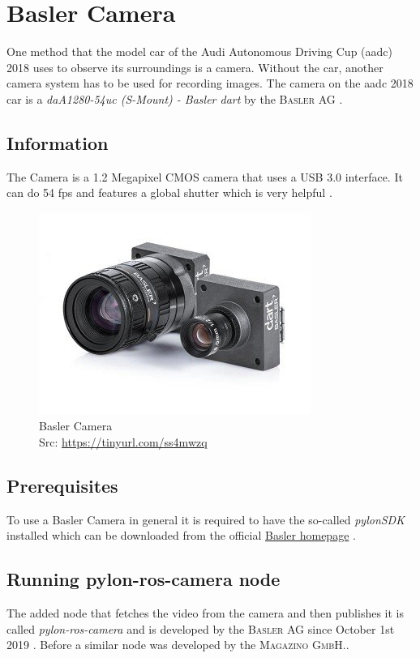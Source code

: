 
\chapter{Basler Camera\authorA}\label{ref:baslercamera}
One method that the model car of the Audi Autonomous Driving Cup (\gls{aadc}) 2018 uses to observe its surroundings is a camera. Without the car, another camera system has to be used for recording images. The camera on the \gls{aadc} 2018 car is a \textit{daA1280-54uc (S-Mount) - Basler dart} by the \textsc{Basler AG} \cite{daA12854uc}.

\section{Information}
The Camera is a 1.2 Megapixel CMOS camera that uses a USB 3.0 interface. It can do 54 \gls{fps} and features a global shutter which is very helpful \cite{baslerCamera}.
\begin{figure}[h]
	\centering
	\includegraphics[height=0.3\textwidth]{./media/images/Basler-Camera.jpg}
  	\caption{Basler Camera
  	\\Src: \url{https://tinyurl.com/ss4mwzq}}
  	\label{orbslamkittidataset}
\end{figure}

\section{Prerequisites}
To use a Basler Camera in general it is required to have the so-called \textit{pylonSDK} installed which can be downloaded from the official \href{https://www.baslerweb.com/de/vertrieb-support/downloads/downloads-software/}{Basler homepage} \cite{pylonsdkdownloadpage}.

\section{Running pylon-ros-camera node}
The added node that fetches the video from the camera and then publishes it is called \textit{pylon-ros-camera} and is developed by the \textsc{Basler AG} since October 1st 2019 \cite{pylonroscamera}. Before a similar node was developed by the \textsc{Magazino GmbH}.\cite{pyloncamera}.

